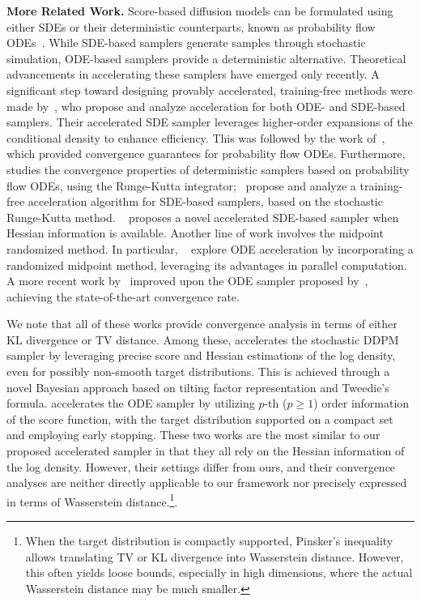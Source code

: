 \documentclass[11pt]{article}
\begin{document}
\vspace{0.2cm}
\noindent \textbf{More Related Work.}
Score-based diffusion models can be formulated using either SDEs or their deterministic counterparts, known as probability flow ODEs~\cite{song2020score}. While SDE-based samplers generate samples through stochastic simulation, ODE-based samplers provide a deterministic alternative. Theoretical advancements in accelerating these samplers have emerged only recently.
A significant step toward designing provably accelerated, training-free methods were made by~\cite{li2024accelerating}, who propose and analyze acceleration for both ODE- and SDE-based samplers. Their accelerated SDE sampler leverages higher-order expansions of the conditional density to enhance efficiency. This was followed by the work of~\cite{li2024sharp}, which provided convergence guarantees for probability flow ODEs.
Furthermore,~\cite{huang2024convergence} studies the convergence properties of deterministic samplers based on probability flow ODEs, using the Runge-Kutta integrator;~\cite{wu2024stochastic} propose and analyze a training-free acceleration algorithm for SDE-based samplers, based on the stochastic Runge-Kutta method.
~\cite{liang2024broadening} proposes a novel accelerated SDE-based sampler when Hessian information is available.
Another line of work involves the midpoint randomized method. 
In particular, ~\cite{gupta2024faster} explore ODE acceleration by incorporating a randomized midpoint method, leveraging its advantages in parallel computation. 
A more recent work by~\cite{li2024improved} improved upon the ODE sampler proposed by~\cite{gupta2024faster}, achieving the state-of-the-art convergence rate.

We note that all of these works provide convergence analysis in terms of either KL divergence or TV distance.
Among these, \cite{liang2024broadening} accelerates the stochastic DDPM sampler by leveraging precise score and Hessian estimations of the log density, even for possibly non-smooth target distributions. This is achieved through a novel Bayesian approach based on tilting factor representation and Tweedie’s formula.
\cite{huang2024convergence} accelerates the ODE sampler by utilizing 
$p$-th ($p\geqslant 1$) order information of the score function, with the target distribution supported on a compact set and employing early stopping. 
These two works are the most similar to our proposed accelerated sampler in that they all rely on the Hessian information of the log density.
However, their settings differ from ours, and their convergence analyses are neither directly applicable to our framework nor precisely expressed in terms of Wasserstein distance.\footnote{When the target distribution is compactly supported, Pinsker's inequality allows translating TV or KL divergence into Wasserstein distance. However, this often yields loose bounds, especially in high dimensions, where the actual Wasserstein distance may be much smaller.}.
\end{document}
